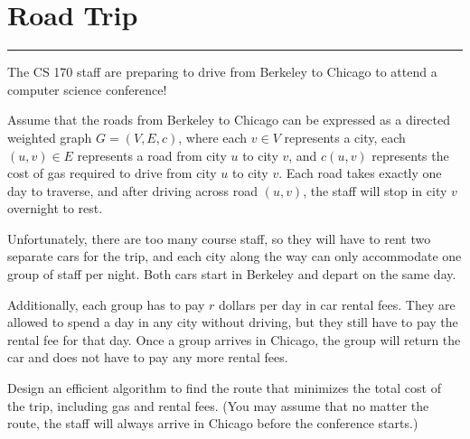 \documentclass{article}
\begin{document}
\newpage
\section*{Road Trip} 
\hrule

The CS 170 staff are preparing to drive from Berkeley to Chicago to attend a computer science conference!

Assume that the roads from Berkeley to Chicago can be expressed as a directed weighted graph $G = (V, E, c)$, where each $v \in V$ represents a city, each $(u, v) \in E$ represents a road from city $u$ to city $v$, and $c(u, v)$ represents the cost of gas required to drive from city $u$ to city $v$. Each road takes exactly one day to traverse, and after driving across road $(u, v)$, the staff will stop in city $v$ overnight to rest.

Unfortunately, there are too many course staff, so they will have to rent two separate cars for the trip, and each city along the way can only accommodate one group of staff per night. Both cars start in Berkeley and depart on the same day.

Additionally, each group has to pay $r$ dollars per day in car rental fees. They are allowed to spend a day in any city without driving, but they still have to pay the rental fee for that day. Once a group arrives in Chicago, the group will return the car and does not have to pay any more rental fees.

Design an efficient algorithm to find the route that minimizes the total cost of the trip, including gas and rental fees. (You may assume that no matter the route, the staff will always arrive in Chicago before the conference starts.)
\end{document}
